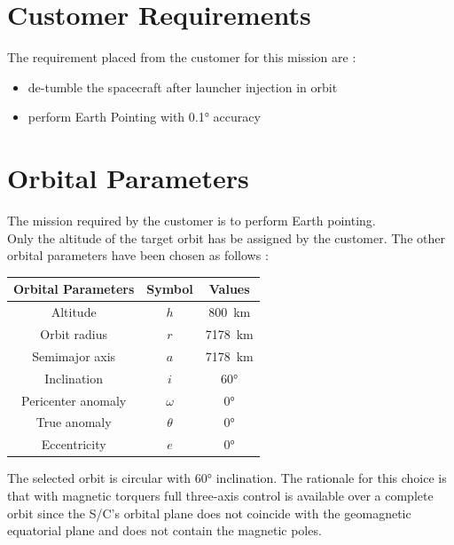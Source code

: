 \documentclass[11pt,a4paper]{report}
\begin{document}
\section{Customer Requirements}
The requirement placed from the customer for this mission are :

\begin{itemize}
 \item de-tumble the spacecraft after launcher injection in orbit
 \item perform Earth Pointing with \ang{0.1} accuracy
\end{itemize}

\section{Orbital Parameters}
The mission required by the customer is to perform Earth pointing. \\   
Only the altitude of the target orbit has be assigned by the customer. The other orbital parameters have been chosen as follows : 

\begin{table}[H]
	\centering
	\begin{tabular}{|c|c|c|}
		\hline
		Orbital Parameters & Symbol & Values \\
		\hline
		Altitude & $h$ & \SI{800}{\km} \\ 
		\hline
		Orbit radius & $r$ & \SI{7178}{\km}\\
		\hline
		Semimajor axis & $a$ & \SI{7178}{\km}\\
		\hline
		Inclination & $i$ & \ang{60}\\
		\hline
		Pericenter anomaly & $\omega$ & \ang{0}\\
		\hline
		True anomaly & $\theta$ &  \ang{0}\\
		\hline
		Eccentricity & $e$ &  \ang{0}\\
		\hline
	\end{tabular}
\end{table}

The selected orbit is circular with \ang{60} inclination.
The rationale for this choice is that with magnetic torquers full three-axis control is available over a complete orbit since the S/C's orbital plane does not coincide with the geomagnetic equatorial plane and does not contain the magnetic poles. 
\end{document}
